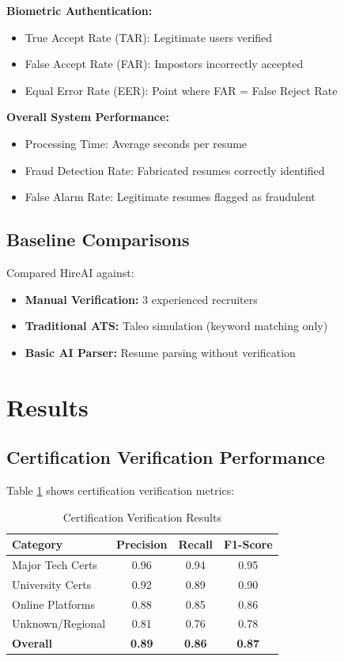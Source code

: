 \documentclass[journal]{IEEEtran}
\begin{document}
\textbf{Biometric Authentication:}
\begin{itemize}
\item True Accept Rate (TAR): Legitimate users verified
\item False Accept Rate (FAR): Impostors incorrectly accepted
\item Equal Error Rate (EER): Point where FAR = False Reject Rate
\end{itemize}

\textbf{Overall System Performance:}
\begin{itemize}
\item Processing Time: Average seconds per resume
\item Fraud Detection Rate: Fabricated resumes correctly identified
\item False Alarm Rate: Legitimate resumes flagged as fraudulent
\end{itemize}

\subsection{Baseline Comparisons}
Compared HireAI against:
\begin{itemize}
\item \textbf{Manual Verification:} 3 experienced recruiters
\item \textbf{Traditional ATS:} Taleo simulation (keyword matching only)
\item \textbf{Basic AI Parser:} Resume parsing without verification
\end{itemize}

\section{Results}

\subsection{Certification Verification Performance}

Table \ref{tab:cert_results} shows certification verification metrics:

\begin{table}[h]
\centering
\caption{Certification Verification Results}
\label{tab:cert_results}
\begin{tabular}{@{}lccc@{}}
\toprule
\textbf{Category} & \textbf{Precision} & \textbf{Recall} & \textbf{F1-Score} \\
\midrule
Major Tech Certs & 0.96 & 0.94 & 0.95 \\
University Certs & 0.92 & 0.89 & 0.90 \\
Online Platforms & 0.88 & 0.85 & 0.86 \\
Unknown/Regional & 0.81 & 0.76 & 0.78 \\
\textbf{Overall} & \textbf{0.89} & \textbf{0.86} & \textbf{0.87} \\
\bottomrule
\end{tabular}
\end{table}
\end{document}
